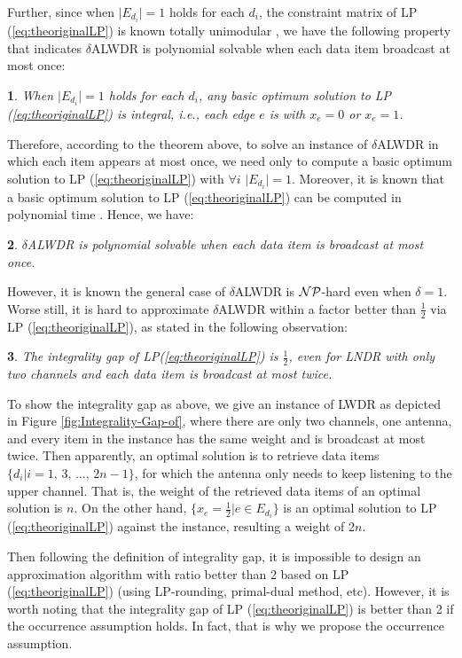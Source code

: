 \documentclass[11pt,english,onecolumn,draftcls]{IEEEtran}
\theoremstyle{plain}
\newtheorem{thm}{\protect\theoremname}
\theoremstyle{plain}
\newtheorem{prop}[thm]{\protect\propositionname}
\theoremstyle{plain}
\theoremstyle{plain}
\newtheorem{cor}[thm]{\protect\corollaryname}
\providecommand{\corollaryname}{Corollary}
\providecommand{\propositionname}{Proposition}
\providecommand{\theoremname}{Theorem}
\begin{document}
Further, since when $\vert E_{d_{i}}\vert=1$ holds for each $d_{i}$,
the constraint matrix of LP (\ref{eq:theoriginalLP}) is known totally
unimodular \cite{schrijver1998theory}, we have the following property
that indicates $\delta$ALWDR is polynomial solvable when each data
item broadcast at most once:
\begin{thm}
\label{Thr:LWDR-is-polynomial-1} When $\vert E_{d_{i}}\vert=1$ holds
for each $d_{i}$, any basic optimum solution to LP (\ref{eq:theoriginalLP})
is integral, i.e., each edge $e$ is with $x_{e}=0$ or $x_{e}=1$.
\end{thm}


Therefore, according to the theorem above, to solve an instance of
$\delta$ALWDR in which each item appears at most once, we need only
to compute a basic optimum solution to LP (\ref{eq:theoriginalLP})
with $\forall i$ $\vert E_{d_{i}}\vert=1$. Moreover, it is known
that a basic optimum solution to LP (\ref{eq:theoriginalLP}) can
be computed in polynomial time \cite{korte2002combinatorial}. Hence,
we have:
\begin{cor}
\label{cor:LWDRpolynomial}$\delta$ALWDR is polynomial solvable when
each data item is broadcast at most once.
\end{cor}
However, it is known the general case of $\delta$ALWDR is ${\cal NP}$-hard
even when $\delta=1$. Worse still, it is hard to approximate $\delta$ALWDR
within a factor better than $\frac{1}{2}$ via LP (\ref{eq:theoriginalLP}),
as stated in the following observation:
\begin{prop}
\label{prop:The-integrality-gap}The integrality gap of LP(\ref{eq:theoriginalLP})
is $\frac{1}{2}$, even for LNDR with only two channels and each data
item is broadcast at most twice.
\end{prop}
To show the integrality gap as above, we give an instance of LWDR
as depicted in Figure \ref{fig:Integrality-Gap-of}, where there are
only two channels, one antenna, and every item in the instance has
the same weight and is broadcast at most twice. Then apparently, an
optimal solution is to retrieve data items $\{d_{i}\vert i=1,\,3,\,\dots,\,2n-1\}$, for
which the antenna only needs to keep listening to the upper channel.
That is, the weight of the retrieved data items of an optimal solution
is $n$. On the other hand, $\{x_{e}=\frac{1}{2}\vert e\in E_{d_{i}}\}$
is an optimal solution to LP (\ref{eq:theoriginalLP}) against the
instance, resulting a weight of 2$n$.

Then following the definition of integrality gap, it is impossible
to design an approximation algorithm with ratio better than 2 based
on LP (\ref{eq:theoriginalLP}) (using LP-rounding, primal-dual method,
etc). However, it is worth noting that the integrality gap of LP (\ref{eq:theoriginalLP})
is better than 2 if the occurrence assumption holds. In fact, that
is why we propose the occurrence assumption.
\end{document}

